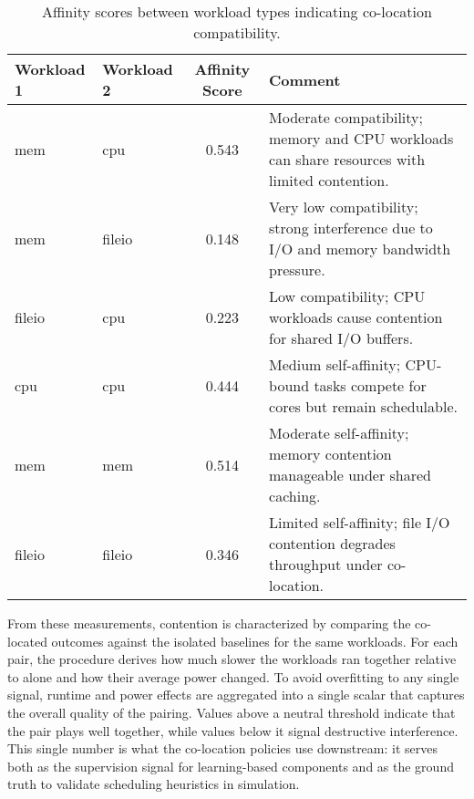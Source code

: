 \begin{table}[H]
    \centering
    \caption{Affinity scores between workload types indicating co-location compatibility.}
    \label{tab:affinity_scores}
    \begin{tabularx}{\textwidth}{l l c X}
        \toprule
        \textbf{Workload 1} & \textbf{Workload 2} & \textbf{Affinity Score} & \textbf{Comment}                                                                              \\
        \midrule
        mem                 & cpu                 & 0.543                   & Moderate compatibility; memory and CPU workloads can share resources with limited contention. \\
        mem                 & fileio              & 0.148                   & Very low compatibility; strong interference due to I/O and memory bandwidth pressure.         \\
        fileio              & cpu                 & 0.223                   & Low compatibility; CPU workloads cause contention for shared I/O buffers.                     \\
        cpu                 & cpu                 & 0.444                   & Medium self-affinity; CPU-bound tasks compete for cores but remain schedulable.               \\
        mem                 & mem                 & 0.514                   & Moderate self-affinity; memory contention manageable under shared caching.                    \\
        fileio              & fileio              & 0.346                   & Limited self-affinity; file I/O contention degrades throughput under co-location.             \\
        \bottomrule
    \end{tabularx}
\end{table}

From these measurements, contention is characterized by comparing the co-located outcomes against the isolated baselines for the same workloads. For each pair, the procedure derives how much slower the workloads ran together relative to alone and how their average power changed. To avoid overfitting to any single signal, runtime and power effects are aggregated into a single scalar that captures the overall quality of the pairing. Values above a neutral threshold indicate that the pair plays well together, while values below it signal destructive interference. This single number is what the co-location policies use downstream: it serves both as the supervision signal for learning-based components and as the ground truth to validate scheduling heuristics in simulation.


